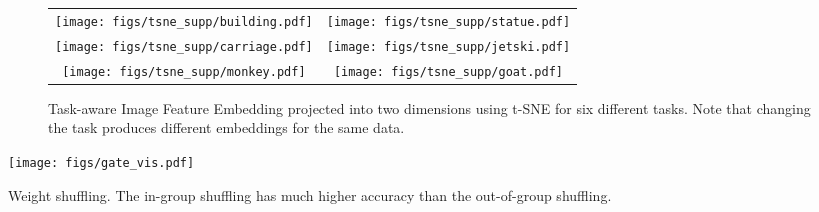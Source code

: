 \documentclass[10pt,twocolumn,letterpaper]{article}
\begin{document}
\begin{figure*}[h!]
\begin{tabular}{cc}
\texttt{[image: figs/tsne\_supp/building.pdf]} &
\texttt{[image: figs/tsne\_supp/statue.pdf]} \\
\texttt{[image: figs/tsne\_supp/carriage.pdf]} &
\texttt{[image: figs/tsne\_supp/jetski.pdf]} \\
\texttt{[image: figs/tsne\_supp/monkey.pdf]} &
\texttt{[image: figs/tsne\_supp/goat.pdf]} \\
\end{tabular}
\caption{Task-aware Image Feature Embedding projected into two dimensions using t-SNE\cite{tsne} for six different tasks. Note that changing the task produces different embeddings for the same data.}
\label{fig:tsne}
\end{figure*}%
    \centering
    \texttt{[image: figs/gate\_vis.pdf]}
    \caption{Weight shuffling. The in-group shuffling has much higher accuracy than the out-of-group shuffling.}
    \label{fig:vis_shuffle}
\end{document}
